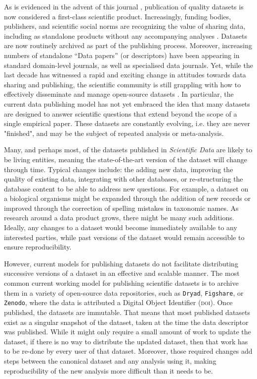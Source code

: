 \documentclass[a4paper,11pt]{article}
\begin{document}
As is evidenced in the advent of this journal \citep{Editorial-2014}, publication of quality datasets is now considered a first-class scientific product. Increasingly, funding bodies, publishers, and scientific social norms are recognizing the value of sharing data, including as standalone products without any accompanying analyses \citep[e.g.][]{Whitlock-2011,Fairbairn-2011,Piwowar-2011,VanNoorden-2013,Gibney-2013}. Datasets are now routinely archived as part of the publishing process. Moreover, increasing numbers of standalone ``Data papers'' (or descriptors) have been appearing in standard domain-level journals, as well as specialised data journals. Yet, while the last decade has witnessed a rapid and exciting change in attitudes towards data sharing and publishing, the scientific community is still grappling with how to effectively disseminate and manage open-source datasets \citep{Whitlock-2011, Goodman-2014, Lowndes-2017,Perkel-2016,VanNoorden-2013, Kratz-2015}. In particular, the current data publishing model has not yet embraced the idea that many  datasets are designed to answer scientific questions that extend beyond the scope of a single empirical paper.  These datasets are constantly evolving, i.e. they are never "finished", and may be the subject of repeated analysis or meta-analysis.

Many, and perhaps most, of the datasets published in \emph{Scientific Data} are likely to be living entities, meaning the state-of-the-art version of the dataset will change through time. Typical changes include: the adding new data, improving the quality of existing data, integrating with other databases, or re-structuring the database content to be able to address new questions. For example, a dataset on a biological organisms might be expanded through the addition of new records or improved through the correction of spelling mistakes in taxonomic names. As research around a data product grows, there might be many such additions. Ideally, any changes to a dataset would become immediately available to any interested parties, while past versions of the dataset would remain accessible to ensure reproducibility.

However, current models for publishing datasets do not facilitate distributing successive versions of a dataset in an effective and scalable manner. The most common current working model for publishing scientific datasets is to archive them in a variety of open-source data repositories, such as \texttt{Dryad}, \texttt{Figshare}, or \texttt{Zenodo}, where the data is attributed a Digital Object Identifier (\textsc{doi}). Once published, the datasets are immutable. That means that most published datasets exist as a singular snapshot of the dataset, taken at the time the data descriptor was published. While it might only require a small amount of work to update the dataset, if there is no way to distribute the updated dataset, then that work has to be re-done by every user of that dataset. Moreover, those required changes add steps between the canonical dataset and any analysis using it, making reproducibility of the new analysis more difficult than it needs to be.
\end{document}
